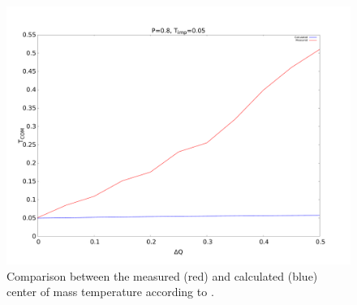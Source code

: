 \documentclass[12pt]{article}
\begin{document}
\begin{figure}
    \begin{center}
        \includegraphics[scale=0.3]{images/measurevscalc.pdf}
        \caption{Comparison between the measured (red) and calculated (blue) center of mass temperature according to \cite{MillenJ.2014}.}
        \label{fig:measurevscalc}
    \end{center}
\end{figure}







\end{document}
